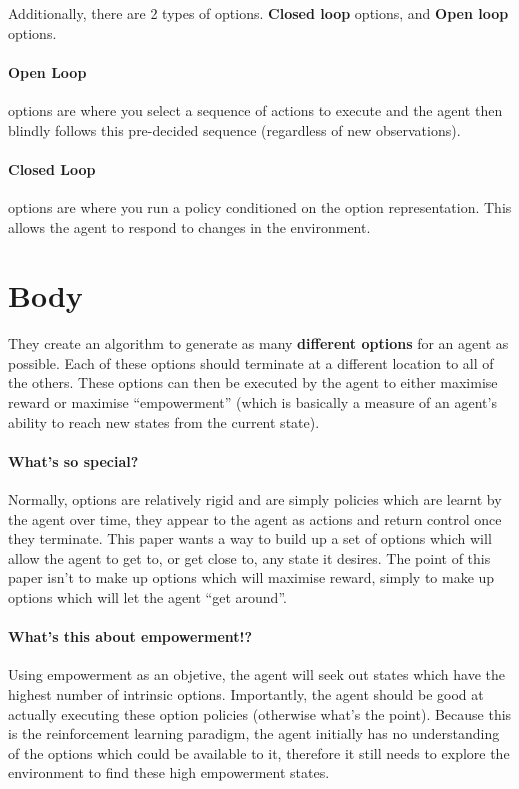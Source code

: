 \documentclass{article}
\begin{document}
\pagebreak
Additionally, there are 2 types of options. {\bf Closed loop} options, and {\bf Open loop} options.
\paragraph{Open Loop} options are where you select a sequence of actions to execute and the agent then blindly follows this pre-decided sequence (regardless of new observations).
\paragraph{Closed Loop} options are where you run a policy conditioned on the option representation. This allows the agent to respond to changes in the environment.

\section{Body}

They create an algorithm to generate as many {\bf different options} for an agent as possible. Each of these options should terminate at a different location to all of the others. These options can then be executed by the agent to either maximise reward or maximise ``empowerment'' (which is basically a measure of an agent's ability to reach new states from the current state).


\paragraph{What's so special?} Normally, options are relatively rigid and are simply policies which are learnt by the agent over time, they appear to the agent as actions and return control once they terminate. This paper wants a way to build up a set of options which will allow the agent to get to, or get close to, any state it desires. The point of this paper isn't to make up options which will maximise reward, simply to make up options which will let the agent ``get around''.


\paragraph{What's this about empowerment!?} Using empowerment as an objetive, the agent will seek out states which have the highest number of intrinsic options. Importantly, the agent should be good at actually executing these option policies (otherwise what's the point). Because this is the reinforcement learning paradigm, the agent initially has no understanding of the options which could be available to it, therefore it still needs to explore the environment to find these high empowerment states.
\end{document}

